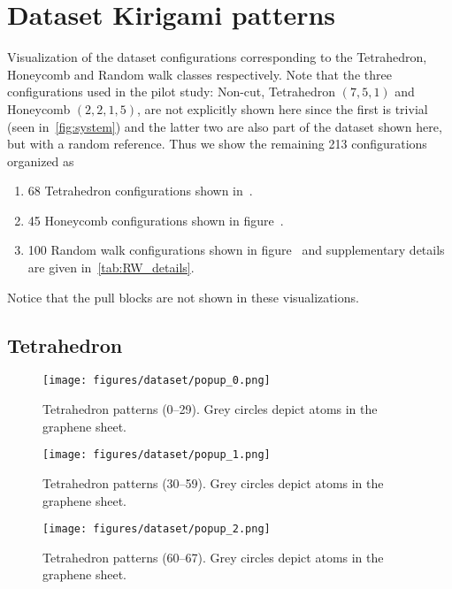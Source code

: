 \chapter{Dataset Kirigami patterns}\label{sec:dataset_conf}
Visualization of the dataset configurations corresponding to the Tetrahedron, Honeycomb and Random walk classes respectively. Note that the three configurations used in the pilot study: Non-cut, Tetrahedron $(7,5,1)$ and Honeycomb $(2,2,1,5)$, are not explicitly shown here since the first is trivial (seen in~\cref{fig:system}) and the latter two are also part of the dataset shown here, but with a random reference. Thus we show the remaining 213 configurations organized as
\begin{enumerate}
    \item 68 Tetrahedron configurations shown in~.
    \item 45 Honeycomb configurations shown in figure~.
    \item 100 Random walk configurations shown in figure~ and supplementary details are given in~\cref{tab:RW_details}.
\end{enumerate}
Notice that the pull blocks are not shown in these visualizations.
\newpage

\section{Tetrahedron}
\vspace*{-1cm}
\begin{figure}[H]
    \centering
    \texttt{[image: figures/dataset/popup\_0.png]}
    \caption{Tetrahedron patterns (0--29). Grey circles depict atoms in the graphene sheet.}
    \label{fig:T0}
\end{figure}
\pagebreak

\vspace*{0cm}
\begin{figure}[H]
    \centering
    \texttt{[image: figures/dataset/popup\_1.png]}
    \caption{Tetrahedron patterns (30--59). Grey circles depict atoms in the graphene sheet.}
    \label{fig:T1}
\end{figure}
\pagebreak

\begin{figure}[!t]
    \centering
    \vspace*{2.5cm}
    \texttt{[image: figures/dataset/popup\_2.png]}
    \caption{Tetrahedron patterns (60--67). Grey circles depict atoms in the graphene sheet.}
    \label{fig:T2}
\end{figure}
\pagebreak


